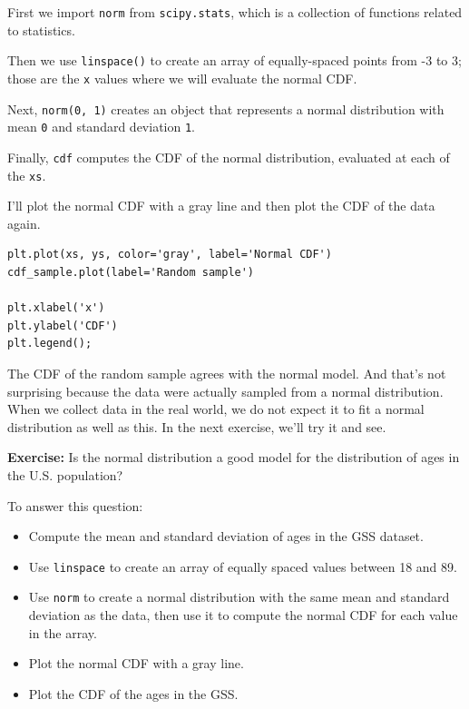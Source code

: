 First we import \passthrough{\lstinline!norm!} from
\passthrough{\lstinline!scipy.stats!}, which is a collection of
functions related to statistics.

Then we use \passthrough{\lstinline!linspace()!} to create an array of
equally-spaced points from -3 to 3; those are the
\passthrough{\lstinline!x!} values where we will evaluate the normal
CDF.

Next, \passthrough{\lstinline!norm(0, 1)!} creates an object that
represents a normal distribution with mean \passthrough{\lstinline!0!}
and standard deviation \passthrough{\lstinline!1!}.

Finally, \passthrough{\lstinline!cdf!} computes the CDF of the normal
distribution, evaluated at each of the \passthrough{\lstinline!xs!}.

I'll plot the normal CDF with a gray line and then plot the CDF of the
data again.

\begin{lstlisting}[]
plt.plot(xs, ys, color='gray', label='Normal CDF')
cdf_sample.plot(label='Random sample')

plt.xlabel('x')
plt.ylabel('CDF')
plt.legend();
\end{lstlisting}

The CDF of the random sample agrees with the normal model. And that's
not surprising because the data were actually sampled from a normal
distribution. When we collect data in the real world, we do not expect
it to fit a normal distribution as well as this. In the next exercise,
we'll try it and see.

\textbf{Exercise:} Is the normal distribution a good model for the
distribution of ages in the U.S. population?

To answer this question:

\begin{itemize}
\item
  Compute the mean and standard deviation of ages in the GSS dataset.
\item
  Use \passthrough{\lstinline!linspace!} to create an array of equally
  spaced values between 18 and 89.
\item
  Use \passthrough{\lstinline!norm!} to create a normal distribution
  with the same mean and standard deviation as the data, then use it to
  compute the normal CDF for each value in the array.
\item
  Plot the normal CDF with a gray line.
\item
  Plot the CDF of the ages in the GSS.
\end{itemize}

